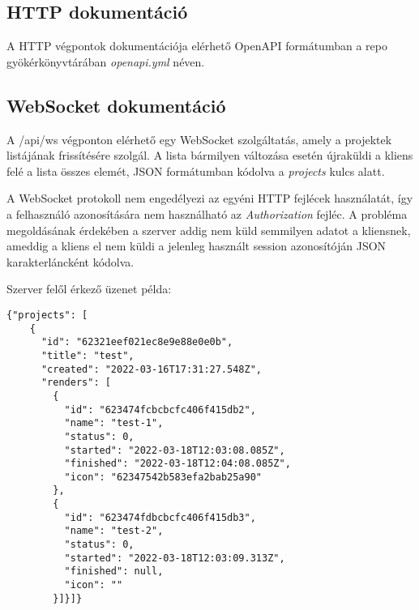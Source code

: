 \subsection{HTTP dokumentáció}
A HTTP végpontok dokumentációja elérhető OpenAPI formátumban a repo gyökérkönyvtárában \emph{openapi.yml} néven.

\subsection{WebSocket dokumentáció}
A /api/ws végponton elérhető egy WebSocket szolgáltatás, amely a projektek listájának frissítésére szolgál. A lista bármilyen változása esetén újraküldi a kliens felé a lista összes elemét, JSON formátumban kódolva a \emph{projects} kulcs alatt.

A WebSocket protokoll nem engedélyezi az egyéni HTTP fejlécek használatát, így a felhasználó azonosítására nem használható az \emph{Authorization} fejléc. A probléma megoldásának érdekében a szerver addig nem küld semmilyen adatot a kliensnek, ameddig a kliens el nem küldi a jelenleg használt session azonosítóján JSON karakterláncként kódolva.

Szerver felől érkező üzenet példa:
\begin{lstlisting}
{"projects": [
    {
      "id": "62321eef021ec8e9e88e0e0b",
      "title": "test",
      "created": "2022-03-16T17:31:27.548Z",
      "renders": [
        {
          "id": "623474fcbcbcfc406f415db2",
          "name": "test-1",
          "status": 0,
          "started": "2022-03-18T12:03:08.085Z",
          "finished": "2022-03-18T12:04:08.085Z",
          "icon": "62347542b583efa2bab25a90"
        },
        {
          "id": "623474fdbcbcfc406f415db3",
          "name": "test-2",
          "status": 0,
          "started": "2022-03-18T12:03:09.313Z",
          "finished": null,
          "icon": ""
        }]}]}
\end{lstlisting}